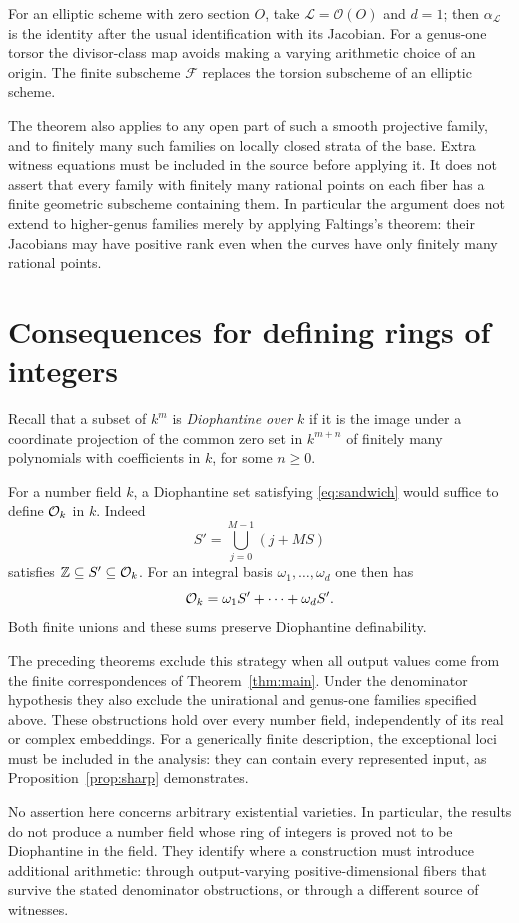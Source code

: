 \documentclass[11pt,a4paper]{article}
\theoremstyle{definition}
\begin{document}
For an elliptic scheme with zero section $O$, take
$\mathcal L=\mathcal O(O)$ and $d=1$; then
$\alpha_{\mathcal L}$ is the identity after the usual identification
with its Jacobian. For a genus-one torsor the divisor-class map
avoids making a varying arithmetic choice of an origin. The finite
subscheme $\mathcal F$ replaces the torsion subscheme of an elliptic
scheme.

The theorem also applies to any open part of such a smooth projective
family, and to finitely many such families on locally closed strata
of the base. Extra witness equations must be included in the source
before applying it. It does not assert that every family with
finitely many rational points on each fiber has a finite geometric
subscheme containing them. In particular the argument does not
extend to higher-genus families merely by applying Faltings's theorem:
their Jacobians may have positive rank even when the curves have
only finitely many rational points.

\section{Consequences for defining rings of integers}

Recall that a subset of $k^m$ is \emph{Diophantine over $k$} if it is
the image under a coordinate projection of the common zero set in
$k^{m+n}$ of finitely many polynomials with coefficients in $k$,
for some $n\ge0$.

For a number field $k$, a Diophantine set satisfying
\eqref{eq:sandwich} would suffice to define $\mathcal O_k$ in $k$.
Indeed
\[
                   S'=\bigcup_{j=0}^{M-1}(j+MS)
\]
satisfies $\mathbb Z\subseteq S'\subseteq\mathcal O_k$. For an integral basis
$\omega_1,\ldots,\omega_d$ one then has
\[
                     \mathcal O_k=\omega_1S'+\cdots+\omega_dS'.
\]
Both finite unions and these sums preserve Diophantine definability.

The preceding theorems exclude this strategy when all output values
come from the finite correspondences of Theorem~\ref{thm:main}.
Under the denominator hypothesis they also exclude the unirational
and genus-one families specified above. These obstructions hold over
every number field, independently of its real or complex embeddings.
For a generically finite description, the exceptional loci must be
included in the analysis: they can contain every represented input,
as Proposition~\ref{prop:sharp} demonstrates.

No assertion here concerns arbitrary existential varieties. In
particular, the results do not produce a number field whose ring of
integers is proved not to be Diophantine in the field. They identify
where a construction must introduce additional arithmetic: through
output-varying positive-dimensional fibers that survive the stated
denominator obstructions, or through a different source of witnesses.
\end{document}
